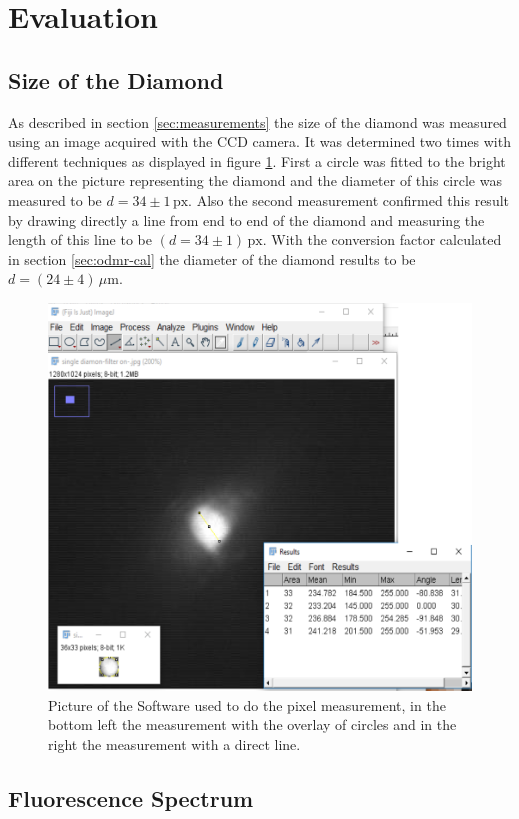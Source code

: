 \section{Evaluation}
\subsection{Size of the Diamond}
\label{sec:size}

As described in section \ref{sec:measurements} the size of the diamond was measured using an image acquired with the CCD camera. It was determined two times with different techniques as displayed in figure \ref{fig:diasize4}. First a circle was fitted to the bright area on the picture representing the diamond and the diameter of this circle was measured to be $d=34\pm1\,\mathrm{px}$. Also the second measurement confirmed this result by drawing directly a line from end to end of the diamond and measuring the length of this line to be $(d=34\pm1)\,\mathrm{px}$. With the conversion factor calculated in section \ref{sec:odmr-cal} the diameter of the diamond results to be $d=(24\pm4)\,\mu\mathrm{m}$.

\begin{figure}[hb]
	\centering
	\includegraphics[width=0.7\linewidth]{../figures/Diasize4}
	\caption[Measuring of the size of the diamond]{Picture of the Software used to do the pixel measurement, in the bottom left the measurement with the overlay of circles and in the right the measurement with a direct line.}
	\label{fig:diasize4}
\end{figure}


\subsection{Fluorescence Spectrum}

